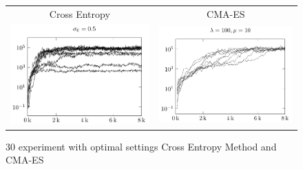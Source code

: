 \begin{figure}[H]
\begin{tabular}{@{}c@{}c@{}}
Cross Entropy & CMA-ES\\
\includegraphics[scale=1]{plots/cma_initial_sigma_0_5} &
\includegraphics[scale=1]{plots/ce_ConstantNoise_l100_o10_all}
\end{tabular}
\caption{30 experiment with optimal settings Cross Entropy Method and CMA-ES \label{fig:appendix:initialNonmean}}
\end{figure}

